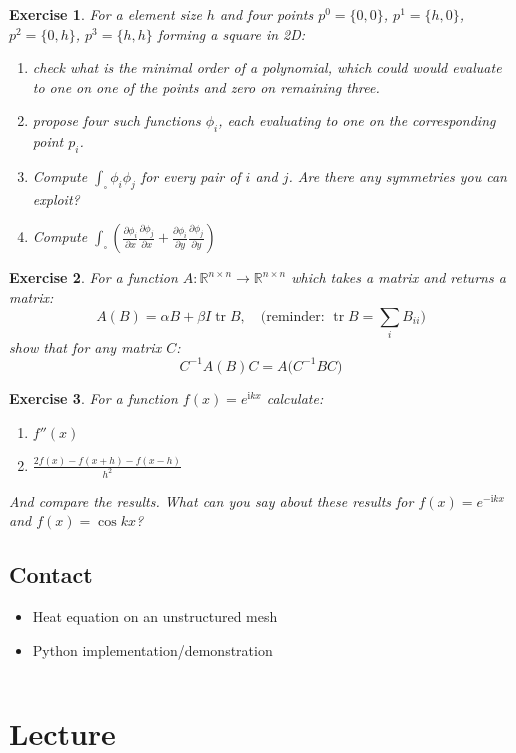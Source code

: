 \documentclass{article}
\DeclareMathOperator{\tr}{tr}
\newcommand{\rr}[2]{\frac{\partial #1}{\partial #2}}
\newtheorem{exercise}{Exercise}[section]
\begin{document}
\begin{exercise}
For a element size $h$ and four points $p^0=\{0,0\}$, $p^1=\{h,0\}$, $p^2=\{0,h\}$, $p^3=\{h,h\}$ forming a square in 2D:
\begin{enumerate}[label=\alph*)]
\item check what is the minimal order of a polynomial, which could would evaluate to one on one of the points and zero on remaining three.
\item propose four such functions $\phi_i$, each evaluating to one on the corresponding point $p_i$.
\item Compute $\int_\square\phi_i\phi_j$ for every pair of $i$ and $j$. Are there any symmetries you can exploit?
\item Compute $\int_\square \left(\rr{\phi_i}{x}\rr{\phi_j}{x} + \rr{\phi_i}{y}\rr{\phi_j}{y}\right)$
\end{enumerate}
\end{exercise}

\begin{exercise}
For a function $A:\mathbb{R}^{n\times n}\rightarrow\mathbb{R}^{n\times n}$ which takes a matrix and returns a matrix:
\[A(B) = \alpha B + \beta I \tr{B},\quad\text{(reminder: $\tr{B}=\sum_iB_{ii}$)}\]
show that for any matrix $C$:
\[C^{-1}A(B)C = A\big(C^{-1}BC\big)\]
\end{exercise}

\begin{exercise}
For a function $f(x) = e^{\mathrm{i}kx}$ calculate:
\begin{enumerate}[label=\alph*)]
\item $f''(x)$
\item $\frac{2f(x)-f(x+h)-f(x-h)}{h^2}$
\end{enumerate}
And compare the results. What can you say about these results for $f(x) = e^{-\mathrm{i}kx}$ and $f(x) = \cos{kx}$?
\end{exercise}


\subsection*{Contact}
\begin{itemize}
    \item Heat equation on an unstructured mesh
    \item Python implementation/demonstration
\end{itemize}
\inputminted{R}{heat.R}

\section{Lecture}
\end{document}
